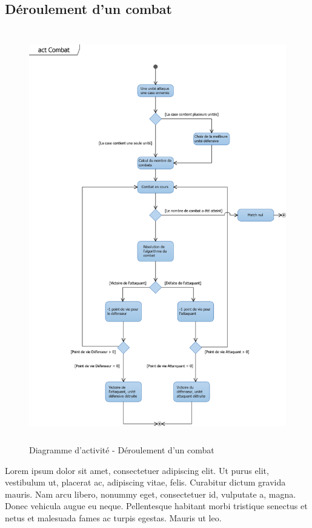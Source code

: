 \documentclass[a4paper,11pt]{article}
\begin{document}
\subsection{Déroulement d'un combat}
\begin{figure}[ht!]
\includegraphics[height=18cm]{actCombat.png}
\caption{Diagramme d'activité - Déroulement d'un combat}
\label{fig:actcombat}
\end{figure}
\vspace*{1cm}
Lorem ipsum dolor sit amet, consectetuer adipiscing elit. Ut purus elit, vestibulum ut, placerat ac, adipiscing vitae, felis. Curabitur dictum gravida mauris. Nam arcu libero, nonummy eget, consectetuer id, vulputate a, magna. Donec vehicula augue eu neque. Pellentesque habitant morbi tristique senectus et netus et malesuada fames ac turpis egestas. Mauris ut leo. 
\newpage
\end{document}

